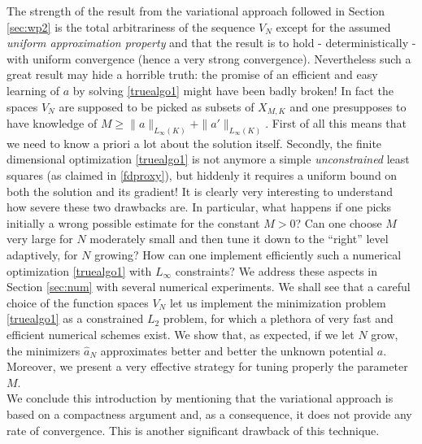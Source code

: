 The strength of the result from the variational approach followed in Section \ref{sec:wp2} is the total arbitrariness of the sequence $V_N$ except
for the assumed {\it uniform approximation property} and that the result is  to hold - deterministically - with uniform convergence (hence a very strong convergence). Nevertheless such 
a great result may  hide a horrible truth: the promise of an efficient and easy learning of $a$ by solving \eqref{truealgo1} might have been badly broken! In fact the spaces $V_N$ are supposed
to be picked as subsets of $X_{M,K}$ and one presupposes to have knowledge of $M \geq \|a\|_{L_{\infty}(K)} + \|a'\|_{L_{\infty}(K)}$. First of all this means that we need
to know a priori a lot about the solution itself. Secondly, the finite dimensional optimization \eqref{truealgo1} is not anymore a simple {\it unconstrained} least squares (as claimed in \eqref{fdproxy}),
but hiddenly it requires a uniform bound on both the solution and its gradient! It is clearly very interesting to understand how severe these two drawbacks are. In particular, what happens
if one picks initially a wrong possible estimate for the constant $M>0$? Can one choose $M$ very large for $N$ moderately small and then tune it  down to the ``right'' level adaptively, for $N$ growing?
How can one implement efficiently such a numerical optimization \eqref{truealgo1} with $L_\infty$ constraints?
We address these aspects in Section \ref{sec:num} with several numerical experiments. We shall see that a careful choice of the function spaces $V_N$ let us implement the minimization problem \eqref{truealgo1} as a constrained $L_2$ problem, for which a plethora of very fast and efficient numerical schemes exist. We show that, as expected, if we let $N$ grow, the minimizers $\widehat{a}_N$ approximates better and better the unknown potential $a$. Moreover, we present a very effective strategy for tuning properly the parameter $M$.
\\

We conclude this introduction by mentioning that the variational approach is based on a compactness argument and, as a consequence, it does not provide any rate of convergence. This is another significant drawback of this technique.
\\

